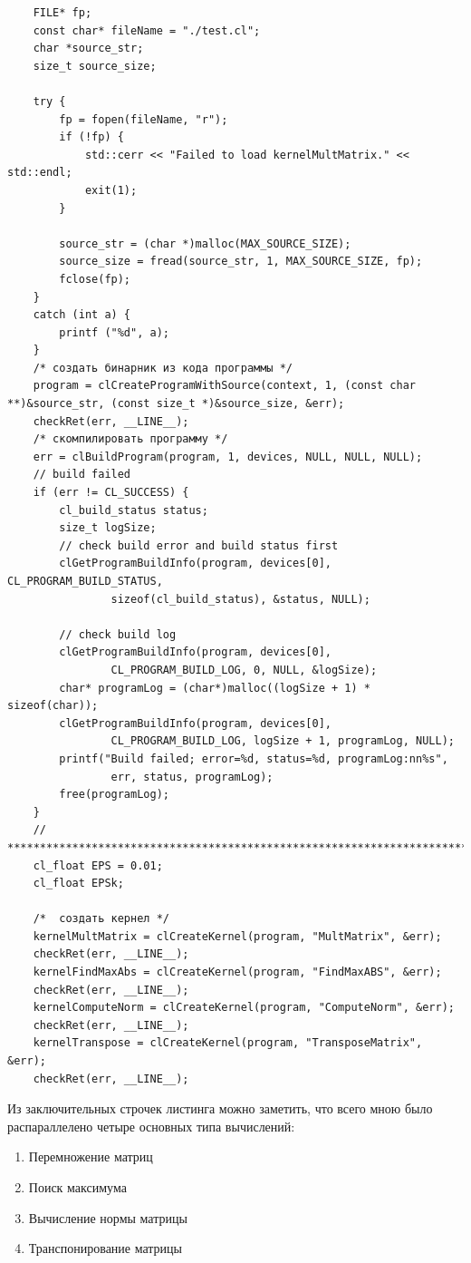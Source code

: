 \documentclass[utf8, 12pt, a4paper, oneside]{article}
\begin{document}
\begin{lstlisting}
    FILE* fp;
    const char* fileName = "./test.cl";
    char *source_str;
    size_t source_size;

    try {
        fp = fopen(fileName, "r");
        if (!fp) {
            std::cerr << "Failed to load kernelMultMatrix." << std::endl;
            exit(1);
        }

        source_str = (char *)malloc(MAX_SOURCE_SIZE);
        source_size = fread(source_str, 1, MAX_SOURCE_SIZE, fp);
        fclose(fp);
    }
    catch (int a) {
        printf ("%d", a);
    }
    /* создать бинарник из кода программы */
    program = clCreateProgramWithSource(context, 1, (const char **)&source_str, (const size_t *)&source_size, &err);
    checkRet(err, __LINE__);    
    /* скомпилировать программу */    
    err = clBuildProgram(program, 1, devices, NULL, NULL, NULL);
    // build failed
    if (err != CL_SUCCESS) {
        cl_build_status status;
        size_t logSize;
        // check build error and build status first
        clGetProgramBuildInfo(program, devices[0], CL_PROGRAM_BUILD_STATUS, 
                sizeof(cl_build_status), &status, NULL);
 
        // check build log
        clGetProgramBuildInfo(program, devices[0], 
                CL_PROGRAM_BUILD_LOG, 0, NULL, &logSize);
        char* programLog = (char*)malloc((logSize + 1) * sizeof(char));
        clGetProgramBuildInfo(program, devices[0], 
                CL_PROGRAM_BUILD_LOG, logSize + 1, programLog, NULL);
        printf("Build failed; error=%d, status=%d, programLog:nn%s", 
                err, status, programLog);
        free(programLog);
    }
    // ************************************************************************************
    cl_float EPS = 0.01;
    cl_float EPSk;
    
    /*  создать кернел */
    kernelMultMatrix = clCreateKernel(program, "MultMatrix", &err);
    checkRet(err, __LINE__);
    kernelFindMaxAbs = clCreateKernel(program, "FindMaxABS", &err);
    checkRet(err, __LINE__);
    kernelComputeNorm = clCreateKernel(program, "ComputeNorm", &err);
    checkRet(err, __LINE__);
    kernelTranspose = clCreateKernel(program, "TransposeMatrix", &err);
    checkRet(err, __LINE__);
\end{lstlisting}

Из заключительных строчек листинга можно заметить, что всего мною было распараллелено четыре основных типа вычислений:
\begin{enumerate}
\item Перемножение матриц
\item Поиск максимума
\item Вычисление нормы матрицы
\item Транспонирование матрицы
\end{enumerate}
\end{document}
